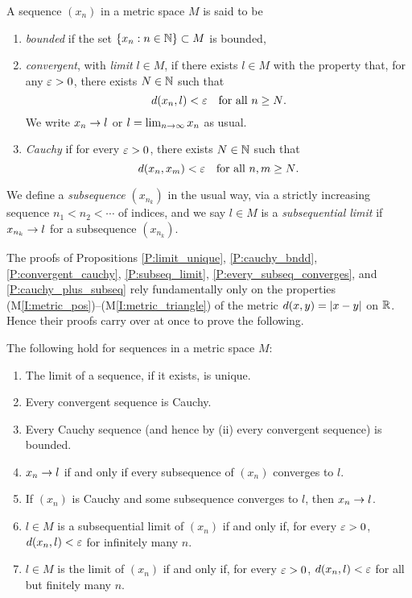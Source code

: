 \documentclass{book}
\begin{document}
\begin{defn}
A sequence $(x_n)$ in a metric space $M$ is said to be
\begin{enumerate}
\item {\em bounded} if the set $\left\{ x_n : n \in \mathbb{N} \right\} \subset M$ is bounded,
\item {\em convergent}, with {\em limit} $l \in M$, if there exists $l \in M$ with the property that, for any $\varepsilon > 0$, there exists $N \in \mathbb{N}$ such that
\[
	d(x_n,l) < \varepsilon \quad \text{for all $n \geq N$.}
\]
We write $x_n \rightarrow l$ or $l = \lim_{n\rightarrow\infty} x_n$ as usual.
\item {\em Cauchy} if for every $\varepsilon > 0$, there exists $N \in \mathbb{N}$ such that 
\[
	d(x_n,x_m) < \varepsilon \quad \text{for all $n,m \geq N$.}
\]
\end{enumerate}
We define a {\em subsequence} $(x_{n_k})$ in the usual way, via a strictly increasing sequence $n_1 < n_2 < \cdots$ of indices, and we say
$l \in M$ is a {\em subsequential limit} if $x_{n_k} \rightarrow l$ for a subsequence $(x_{n_k})$. 
\label{D:metric_seq}
\end{defn}

The proofs of Propositions \ref{P:limit_unique}, \ref{P:cauchy_bndd},
\ref{P:convergent_cauchy}, \ref{P:subseq_limit},
\ref{P:every_subseq_converges}, and \ref{P:cauchy_plus_subseq} rely
fundamentally only on the properties
(M\ref{I:metric_pos})--(M\ref{I:metric_triangle}) of the metric $d(x,y) =
\lvert x - y\rvert$ on $\mathbb{R}$. Hence their proofs carry over at once to prove the
following.
\begin{thm}
The following hold for sequences in a metric space $M$:
\mbox{}
\begin{enumerate}
\item The limit of a sequence, if it exists, is unique.
\item Every convergent sequence is Cauchy.
\item Every Cauchy sequence (and hence by (ii) every convergent sequence) is bounded.
\item $x_n \rightarrow l$ if and only if every subsequence of $(x_n)$ converges to $l$. 
\item If $(x_n)$ is Cauchy and some subsequence converges to $l$, then $x_n \rightarrow l$. 
\item $l \in M$ is a subsequential limit of $(x_n)$ if and only if, for every $\varepsilon > 0$, $d(x_n,l) < \varepsilon$ for infinitely many $n$.
\item $l \in M$ is the limit of $(x_n)$ if and only if, for every $\varepsilon > 0$, $d(x_n, l) < \varepsilon$ for all but finitely many $n$. 
\end{enumerate}
\label{T:metric_seqs}
\end{thm}
\end{document}
